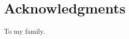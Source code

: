 \cleardoublepage
{}
{}

\begingroup
\let\clearpage\relax
\let\cleardoublepage\relax
\let\cleardoublepage\relax

\chapter*{Acknowledgments}

To my family.

\endgroup
